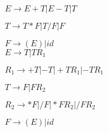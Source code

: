 \begin{question}

$E \rightarrow E + T | E - T | T$

$T \rightarrow T * F | T / F | F$

$F \rightarrow (E) | id$ \\

$E \rightarrow T | TR_1$

$R_1 \rightarrow +T | -T | +TR_1 | -TR_1$

$T \rightarrow F | FR_2$

$R_2 \rightarrow *F | /F | *FR_2 | /FR_2$

$F \rightarrow (E) | id$
  
\end{question}
